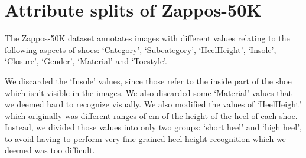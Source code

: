 

\section{Attribute splits of Zappos-50K}
The Zappos-50K dataset annotates images with different values relating to the following aspects of shoes: `Category', `Subcategory', `HeelHeight', `Insole', `Closure', `Gender', `Material' and `Toestyle'.

We discarded the `Insole' values, since those refer to the inside part of the shoe which isn't visible in the images. We also discarded some `Material' values that we deemed hard to recognize visually. We also modified the values of `HeelHeight' which originally was different ranges of cm of the height of the heel of each shoe. Instead, we divided those values into only two groups: `short heel' and `high heel', to avoid having to perform very fine-grained heel height recognition which we deemed was too difficult.

